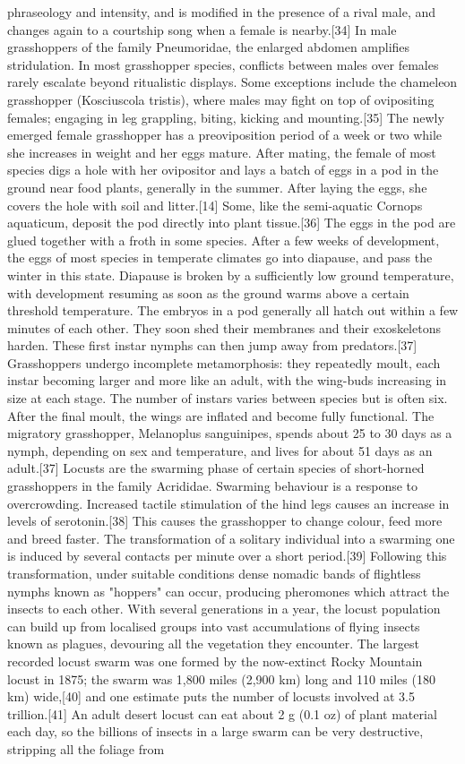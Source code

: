 \documentclass[twoside, 12pt, letterpaper]{report}\usepackage[]{graphicx}\usepackage[]{color}
\begin{document}
\begin{multicols*}{2}
phraseology and intensity, and is modified in the presence of a rival male, and changes again to a courtship song when a female is nearby.[34] In male grasshoppers of the family Pneumoridae, the enlarged abdomen amplifies stridulation. In most grasshopper species, conflicts between males over females rarely escalate beyond ritualistic displays. Some exceptions include the chameleon grasshopper (Kosciuscola tristis), where males may fight on top of ovipositing females; engaging in leg grappling, biting, kicking and mounting.[35] The newly emerged female grasshopper has a preoviposition period of a week or two while she increases in weight and her eggs mature. After mating, the female of most species digs a hole with her ovipositor and lays a batch of eggs in a pod in the ground near food plants, generally in the summer. After laying the eggs, she covers the hole with soil and litter.[14] Some, like the semi-aquatic Cornops aquaticum, deposit the pod directly into plant tissue.[36] The eggs in the pod are glued together with a froth in some species. After a few weeks of development, the eggs of most species in temperate climates go into diapause, and pass the winter in this state. Diapause is broken by a sufficiently low ground temperature, with development resuming as soon as the ground warms above a certain threshold temperature. The embryos in a pod generally all hatch out within a few minutes of each other. They soon shed their membranes and their exoskeletons harden. These first instar nymphs can then jump away from predators.[37] Grasshoppers undergo incomplete metamorphosis: they repeatedly moult, each instar becoming larger and more like an adult, with the wing-buds increasing in size at each stage. The number of instars varies between species but is often six. After the final moult, the wings are inflated and become fully functional. The migratory grasshopper, Melanoplus sanguinipes, spends about 25 to 30 days as a nymph, depending on sex and temperature, and lives for about 51 days as an adult.[37] Locusts are the swarming phase of certain species of short-horned grasshoppers in the family Acrididae. Swarming behaviour is a response to overcrowding. Increased tactile stimulation of the hind legs causes an increase in levels of serotonin.[38] This causes the grasshopper to change colour, feed more and breed faster. The transformation of a solitary individual into a swarming one is induced by several contacts per minute over a short period.[39] Following this transformation, under suitable conditions dense nomadic bands of flightless nymphs known as "hoppers" can occur, producing pheromones which attract the insects to each other. With several generations in a year, the locust population can build up from localised groups into vast accumulations of flying insects known as plagues, devouring all the vegetation they encounter. The largest recorded locust swarm was one formed by the now-extinct Rocky Mountain locust in 1875; the swarm was 1,800 miles (2,900 km) long and 110 miles (180 km) wide,[40] and one estimate puts the number of locusts involved at 3.5 trillion.[41] An adult desert locust can eat about 2 g (0.1 oz) of plant material each day, so the billions of insects in a large swarm can be very destructive, stripping all the foliage from 
\end{multicols*}
\end{document}

